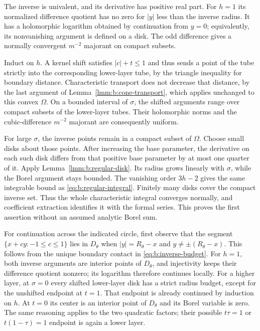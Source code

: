 \begin{prf}
The inverse is univalent, and its derivative has positive real part.
For $h=1$ its normalized difference quotient has no zero for
$|y|$ less than the inverse radius. It has a holomorphic logarithm
obtained by continuation from $y=0$; equivalently, its nonvanishing
argument is defined on a disk. The odd difference gives a normally
convergent $m^{-2}$ majorant on compact subsets.

Induct on $h$. A kernel shift satisfies $|c|+t\leq1$ and thus
sends a point of the tube strictly into the corresponding
lower-layer tube, by the triangle inequality for boundary distance.
Characteristic transport does not decrease that distance, by the
last argument of Lemma~\ref{lmm:b:cone-transport}, which applies
unchanged to this convex $\Omega$. On a bounded interval of
$\sigma$, the shifted arguments range over compact subsets of the
lower-layer tubes. Their holomorphic norms and the cubic-difference
$m^{-2}$ majorant are consequently uniform.

For large $\sigma$, the inverse points remain in a compact subset
of $\Omega$. Choose small disks about those points. After increasing
the base parameter, the derivative on each such disk differs from
that positive base parameter by at most one quarter of it. Apply
Lemma~\ref{lmm:b:regular-disk}. Its radius grows linearly with
$\sigma$, while the Borel argument stays bounded. The vanishing
order $3h-2$ gives the same integrable bound as
\eqref{eq:b:regular-integral}. Finitely many disks cover the compact
inverse set. Thus the whole characteristic integral converges
normally, and coefficient extraction identifies it with the formal
series. This proves the first assertion without an assumed analytic
Borel sum.

For continuation across the indicated circle, first observe that
the segment $\{x+c y:-1\leq c\leq1\}$ lies in $D_\theta$
when $|y|=R_\theta-x$ and $y\ne\pm(R_\theta-x)$.
This follows from the unique boundary contact in
\eqref{eq:b:inverse-budget}. For $h=1$, both inverse arguments
are interior points of $D_\theta$, and injectivity keeps their
difference quotient nonzero; its logarithm therefore continues
locally. For a higher layer, at $\sigma=0$ every shifted
lower-layer disk has a strict radius budget, except for the
unshifted endpoint at $t=1$. That endpoint is already continued
by induction on $h$. At $t=0$ its center is an interior point of
$D_\theta$ and its Borel variable is zero. The same reasoning
applies to the two quadratic factors; their possible $t\tau=1$
or $t(1-\tau)=1$ endpoint is again a lower layer.


\end{prf}

